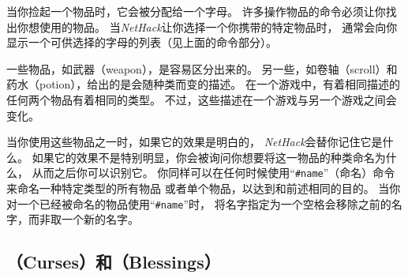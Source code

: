 \documentclass[a4paper, 10pt]{article}
\begin{document}
当你捡起一个物品时，它会被分配给一个\zhTransInventory{}字母。
许多操作物品的命令必须让你找出你想使用的物品。
当{\it NetHack\/}让你选择一个你携带的特定物品时，
通常会向你显示一个可供选择的\zhTransInventory{}字母的列表（见上面的命令部分）。

一些物品，如武器（weapon），是容易区分出来的。
另一些，如卷轴（scroll）和药水（potion），给出的是会随种类而变的描述。
在一个游戏中，有着相同描述的任何两个物品有着相同的类型。
不过，这些描述在一个游戏与另一个游戏之间会变化。

当你使用这些物品之一时，如果它的效果是明白的，
{\it NetHack\/}会替你记住它是什么。
如果它的效果不是特别明显，你会被询问你想要将这一物品的种类命名为什么，
从而之后你可以识别它。
你同样可以在任何时候使用“{\tt \#name}”（命名）命令来命名一种特定类型的所有物品
或者单个物品，以达到和前述相同的目的。
当你对一个已经被命名的物品使用“{\tt \#name}”时，
将名字指定为一个空格会移除之前的名字，而非取一个新的名字。

\subsection*{\zhTransCurses（Curses）和\zhTransBlessing（Blessings）}
\end{document}
